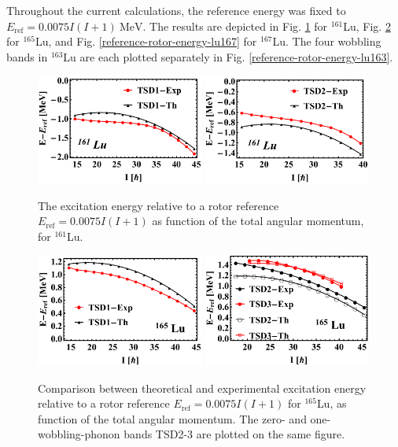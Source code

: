 Throughout the current calculations, the reference energy was fixed to $E_\text{ref}=0.0075I(I+1)\ \text{MeV}$. The results are depicted in Fig. \ref{reference-rotor-energy-lu161} for $^{161}$Lu, Fig. \ref{reference-rotor-energy-lu165} for $^{165}$Lu, and Fig. \ref{reference-rotor-energy-lu167} for $^{167}$Lu. The four wobbling bands in $^{163}$Lu are each plotted separately in Fig. \ref{reference-rotor-energy-lu163}.
\begin{figure}
    \centering
    \includegraphics[width=0.49\textwidth]{Chapters/Figures/Lu-exp-energies/fig11a_lu161.pdf}
    \includegraphics[width=0.49\textwidth]{Chapters/Figures/Lu-exp-energies/fig11b_lu161.pdf}
    \caption{The excitation energy relative to a rotor reference $E_\text{ref}=0.0075I(I+1)$ as function of the total angular momentum, for $^{161}$Lu.}
    \label{reference-rotor-energy-lu161}
\end{figure}
\begin{figure}
    \centering
    \includegraphics[width=0.49\textwidth]{Chapters/Figures/Lu-exp-energies/fig13a_lu165.pdf}
    \includegraphics[width=0.49\textwidth]{Chapters/Figures/Lu-exp-energies/fig13b_lu165.pdf}
    \caption{Comparison between theoretical and experimental excitation energy relative to a rotor reference $E_\text{ref}=0.0075I(I+1)$ for $^{165}$Lu, as function of the total angular momentum. The zero- and one-wobbling-phonon bands TSD2-3 are plotted on the same figure.}
    \label{reference-rotor-energy-lu165}
\end{figure}
